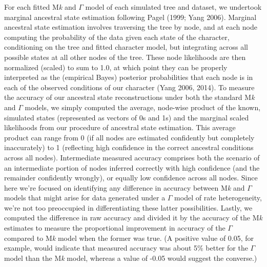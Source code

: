 \documentclass[fleqn,10pt,lineno]{wlpeerj} %
\begin{document}
For each fitted M\emph{k} and \(\Gamma\) model of each simulated tree and dataset, we undertook marginal ancestral state estimation following Pagel (1999; Yang 2006). Marginal ancestral state estimation involves traversing the tree by node, and at each node computing the probability of the data given each state of the character, conditioning on the tree and fitted character model, but integrating across all possible states at all other nodes of the tree. These node likelihoods are then normalized (scaled) to sum to 1.0, at which point they can be properly interpreted as the (empirical Bayes) posterior probabilities that each node is in each of the observed conditions of our character (Yang 2006, 2014). To measure the accuracy of our ancestral state reconstructions under both the standard M\emph{k} and \(\Gamma\) models, we simply computed the average, node-wise product of the known, simulated states (represented as vectors of 0s and 1s) and the marginal scaled likelihoods from our procedure of ancestral state estimation. This average product can range from 0 (if all nodes are estimated confidently but completely inaccurately) to 1 (reflecting high confidence in the correct ancestral conditions across all nodes). Intermediate measured accuracy comprises both the scenario of an intermediate portion of nodes inferred correctly with high confidence (and the remainder confidently wrongly), or equally low confidence across all nodes. Since here we're focused on identifying any difference in accuracy between M\emph{k} and \(\Gamma\) models that might arise for data generated under a \(\Gamma\) model of rate heterogeneity, we're not too preoccupied in differentiating these latter possibilities. Lastly, we computed the difference in raw accuracy and divided it by the accuracy of the M\emph{k} estimates to measure the proportional improvement in accuracy of the \(\Gamma\) compared to M\emph{k} model when the former was true. (A positive value of 0.05, for example, would indicate that measured accuracy was about 5\% better for the \(\Gamma\) model than the M\emph{k} model, whereas a value of -0.05 would suggest the converse.)
\end{document}
